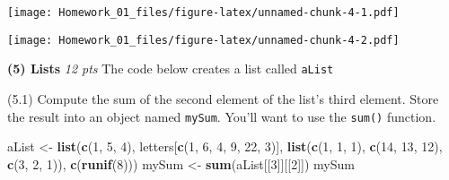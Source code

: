 \documentclass[
]{article}
\newenvironment{Shaded}{\begin{snugshade}}{\end{snugshade}}
\newcommand{\AttributeTok}[1]{\textcolor[rgb]{0.13,0.29,0.53}{#1}}
\newcommand{\DecValTok}[1]{\textcolor[rgb]{0.00,0.00,0.81}{#1}}
\newcommand{\FunctionTok}[1]{\textcolor[rgb]{0.13,0.29,0.53}{\textbf{#1}}}
\newcommand{\NormalTok}[1]{#1}
\newcommand{\OtherTok}[1]{\textcolor[rgb]{0.56,0.35,0.01}{#1}}
\newcommand{\SpecialCharTok}[1]{\textcolor[rgb]{0.81,0.36,0.00}{\textbf{#1}}}
\newcommand{\StringTok}[1]{\textcolor[rgb]{0.31,0.60,0.02}{#1}}
\begin{document}
\texttt{[image: Homework\_01\_files/figure-latex/unnamed-chunk-4-1.pdf]}

\begin{Shaded}
\end{Shaded}

\texttt{[image: Homework\_01\_files/figure-latex/unnamed-chunk-4-2.pdf]}

\textbf{(5) Lists} \emph{12 pts} The code below creates a list called
\texttt{aList}

(5.1) Compute the sum of the second element of the list's third element.
Store the result into an object named \texttt{mySum}. You'll want to use
the \texttt{sum()} function.

\begin{Shaded}
\begin{Highlighting}[]
\NormalTok{aList }\OtherTok{\textless{}{-}} \FunctionTok{list}\NormalTok{(}\FunctionTok{c}\NormalTok{(}\DecValTok{1}\NormalTok{, }\DecValTok{5}\NormalTok{, }\DecValTok{4}\NormalTok{), letters[}\FunctionTok{c}\NormalTok{(}\DecValTok{1}\NormalTok{, }\DecValTok{6}\NormalTok{, }\DecValTok{4}\NormalTok{, }\DecValTok{9}\NormalTok{, }\DecValTok{22}\NormalTok{, }\DecValTok{3}\NormalTok{)], }\FunctionTok{list}\NormalTok{(}\FunctionTok{c}\NormalTok{(}\DecValTok{1}\NormalTok{, }\DecValTok{1}\NormalTok{, }\DecValTok{1}\NormalTok{), }
                        \FunctionTok{c}\NormalTok{(}\DecValTok{14}\NormalTok{, }\DecValTok{13}\NormalTok{, }\DecValTok{12}\NormalTok{), }\FunctionTok{c}\NormalTok{(}\DecValTok{3}\NormalTok{, }\DecValTok{2}\NormalTok{, }\DecValTok{1}\NormalTok{)), }\FunctionTok{c}\NormalTok{(}\FunctionTok{runif}\NormalTok{(}\DecValTok{8}\NormalTok{)))}
\NormalTok{mySum }\OtherTok{\textless{}{-}} \FunctionTok{sum}\NormalTok{(aList[[}\DecValTok{3}\NormalTok{]][[}\DecValTok{2}\NormalTok{]])}
\NormalTok{mySum}
\end{Highlighting}
\end{Shaded}
\end{document}
